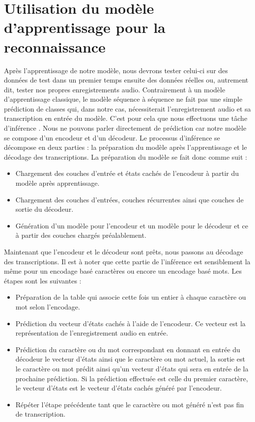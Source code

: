 \section{Utilisation du modèle d'apprentissage pour la reconnaissance}\label{inference}
Après l'apprentissage de notre modèle, nous devrons tester celui-ci sur des données de test dans un premier temps ensuite des données réelles ou, autrement dit, tester nos propres enregistrements audio. Contrairement à un modèle d'apprentissage classique, le modèle séquence à séquence ne fait pas une simple prédiction de classes qui, dans notre cas, nécessiterait l'enregistrement audio et sa transcription en entrée du modèle. C'est pour cela que nous effectuons une tâche d'inférence
\cite{modelinference}. Nous ne pouvons parler directement de prédiction car notre modèle se compose d'un encodeur et d'un décodeur. Le processus d'inférence se décompose en deux parties : la préparation du modèle après l'apprentissage et le décodage des transcriptions. La préparation du modèle se fait donc comme suit :

\begin{itemize}
    \item Chargement des couches d'entrée et états cachés de l'encodeur à partir du modèle après apprentissage.
    \item Chargement des couches d'entrées, couches récurrentes ainsi que couches de sortie du décodeur.
    \item Génération d'un modèle pour l'encodeur et un modèle pour le décodeur et ce à partir des couches chargés préalablement. \\
\end{itemize}

Maintenant que l'encodeur et le décodeur sont prêts, nous passons au décodage des transcriptions. Il est à noter que cette partie de l'inférence est sensiblement la même pour un encodage basé caractères ou encore un encodage basé mots. Les étapes sont les suivantes : 

\begin{itemize}
    \item Préparation de la table qui associe cette fois un entier à chaque caractère ou mot selon l'encodage.
    \item Prédiction du vecteur d'états cachés à l'aide de l'encodeur. Ce vecteur est la représentation de l'enregistrement audio en entrée.
    \item Prédiction du caractère ou du mot correspondant en donnant en entrée du décodeur le vecteur d'états ainsi que le caractère ou mot actuel, la sortie est le caractère ou mot prédit ainsi qu'un vecteur d'états qui sera en entrée de la prochaine prédiction. Si la prédiction effectuée est celle du premier caractère, le vecteur d'états est le vecteur d'états cachés généré par l'encodeur.
    \item Répéter l'étape précédente tant que le caractère ou mot généré n'est pas fin de transcription.
\end{itemize}

